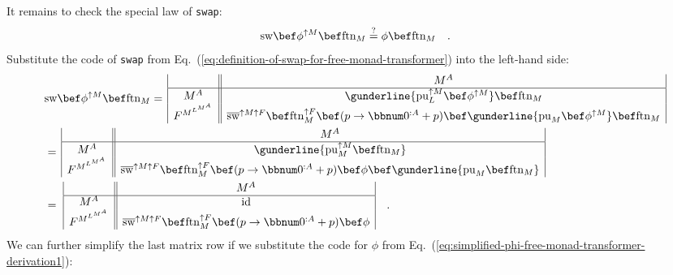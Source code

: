 It remains to check the special law of \lstinline!swap!:
\begin{equation}
\text{sw}\bef\phi^{\uparrow M}\bef\text{ftn}_{M}\overset{?}{=}\phi\bef\text{ftn}_{M}\quad.\label{eq:free-monad-transformer-swap-law-derivation2}
\end{equation}
Substitute the code of \lstinline!swap! from Eq.~(\ref{eq:definition-of-swap-for-free-monad-transformer})
into the left-hand side:
\begin{align*}
 & \text{sw}\bef\phi^{\uparrow M}\bef\text{ftn}_{M}=\,\begin{array}{|c||c|}
 & M^{A}\\
\hline M^{A} & \gunderline{\text{pu}_{L}^{\uparrow M}\bef\phi^{\uparrow M}}\bef\text{ftn}_{M}\\
F^{M^{L^{M^{A}}}} & \overline{\text{sw}}^{\uparrow M\uparrow F}\bef\text{ftn}_{M}^{\uparrow F}\bef(p\rightarrow\bbnum 0^{:A}+p)\bef\gunderline{\text{pu}_{M}\bef\phi^{\uparrow M}}\bef\text{ftn}_{M}
\end{array}\\
 & =\,\begin{array}{|c||c|}
 & M^{A}\\
\hline M^{A} & \gunderline{\text{pu}_{M}^{\uparrow M}\bef\text{ftn}_{M}}\\
F^{M^{L^{M^{A}}}} & \overline{\text{sw}}^{\uparrow M\uparrow F}\bef\text{ftn}_{M}^{\uparrow F}\bef(p\rightarrow\bbnum 0^{:A}+p)\bef\phi\bef\gunderline{\text{pu}_{M}\bef\text{ftn}_{M}}
\end{array}\\
 & =\,\,\begin{array}{|c||c|}
 & M^{A}\\
\hline M^{A} & \text{id}\\
F^{M^{L^{M^{A}}}} & \overline{\text{sw}}^{\uparrow M\uparrow F}\bef\text{ftn}_{M}^{\uparrow F}\bef(p\rightarrow\bbnum 0^{:A}+p)\bef\phi
\end{array}\quad.
\end{align*}
We can further simplify the last matrix row if we substitute the code
for $\phi$ from Eq.~(\ref{eq:simplified-phi-free-monad-transformer-derivation1}):
